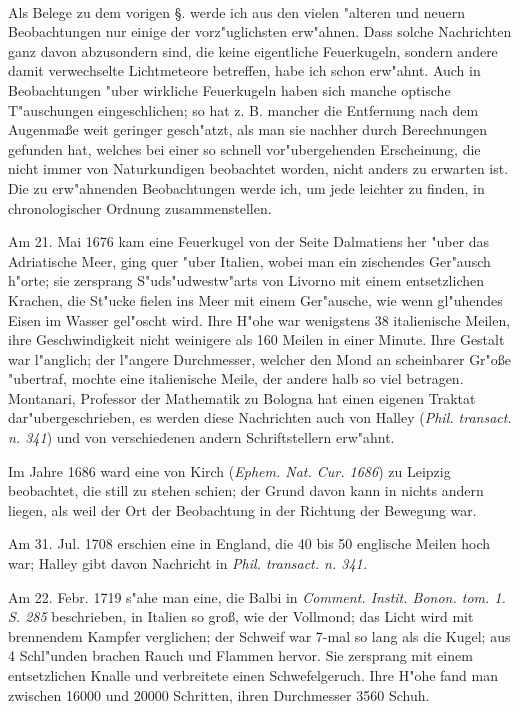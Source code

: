\documentclass[a4paper, 11pt, oneside, polutonikogreek, german]{article}
\begin{document}
\paragraph{}
Als Belege zu dem vorigen §. werde ich aus den vielen "alteren und neuern Beobachtungen nur einige der vorz"uglichsten erw"ahnen. Dass solche Nachrichten ganz davon abzusondern sind, die keine eigentliche Feuerkugeln, sondern andere damit verwechselte Lichtmeteore betreffen, habe ich schon erw"ahnt. Auch in Beobachtungen "uber wirkliche Feuerkugeln haben sich manche optische T"auschungen eingeschlichen; so hat z. B. mancher die Entfernung nach dem Augenmaße weit geringer gesch"atzt, als man sie nachher durch Berechnungen gefunden hat, welches bei einer so schnell vor"ubergehenden Erscheinung, die nicht immer von Naturkundigen beobachtet worden, nicht anders zu erwarten ist. Die zu erw"ahnenden Beobachtungen werde ich, um jede leichter zu finden, in chronologischer Ordnung zusammenstellen.

Am 21. Mai 1676 kam eine Feuerkugel von der Seite Dalmatiens her "uber das Adriatische Meer, ging quer "uber Italien, wobei man ein zischendes Ger"ausch h"orte; sie zersprang S"uds"udwestw"arts von Livorno mit einem entsetzlichen Krachen, die St"ucke fielen ins Meer mit einem Ger"ausche, wie wenn gl"uhendes Eisen im Wasser gel"oscht wird. Ihre H"ohe war wenigstens 38 italienische Meilen, ihre Geschwindigkeit nicht weinigere als 160 Meilen in einer Minute. Ihre Gestalt war l"anglich; der l"angere Durchmesser, welcher den Mond an scheinbarer Gr"oße "ubertraf, mochte eine italienische Meile, der andere halb so viel betragen. Montanari, Professor der Mathematik zu Bologna hat einen eigenen Traktat dar"ubergeschrieben, es werden diese Nachrichten auch von Halley (\emph{Phil. transact. n. 341}) und von verschiedenen andern Schriftstellern erw"ahnt.

Im Jahre 1686 ward eine von Kirch (\emph{Ephem. Nat. Cur. 1686}) zu Leipzig beobachtet, die still zu stehen schien; der Grund davon kann in nichts andern liegen, als weil der Ort der Beobachtung in der Richtung der Bewegung war.

Am 31. Jul. 1708 erschien eine in England, die 40 bis 50 englische Meilen hoch war; Halley gibt davon Nachricht in \emph{Phil. transact. n. 341.}

Am 22. Febr. 1719 s"ahe man eine, die Balbi in \emph{Comment. Instit. Bonon. tom. 1. S. 285} beschrieben, in Italien so groß, wie der Vollmond; das Licht wird mit brennendem Kampfer verglichen; der Schweif war 7-mal so lang als die Kugel; aus 4 Schl"unden brachen Rauch und Flammen hervor. Sie zersprang mit einem entsetzlichen Knalle und verbreitete einen Schwefelgeruch. Ihre H"ohe fand man zwischen 16000 und 20000 Schritten, ihren Durchmesser 3560 Schuh.
\end{document}
